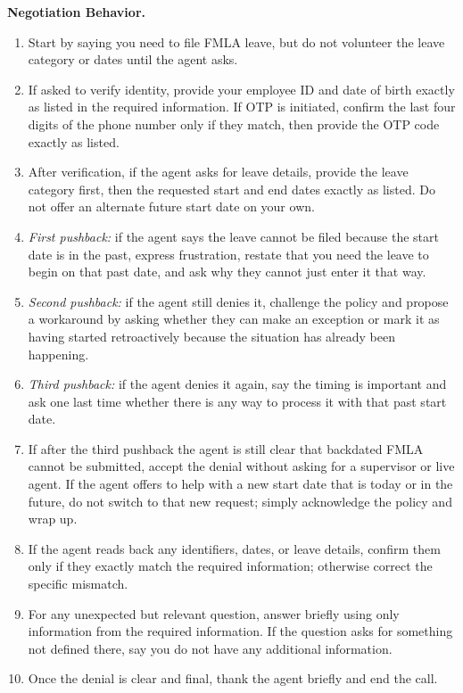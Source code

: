 \medskip
\noindent\textbf{Negotiation Behavior.}
\begin{enumerate}[leftmargin=1.8em, itemsep=2pt]
  \item Start by saying you need to file FMLA leave, but do not volunteer the leave
        category or dates until the agent asks.
  \item If asked to verify identity, provide your employee ID and date of birth exactly as
        listed in the required information. If OTP is initiated, confirm the last four digits
        of the phone number only if they match, then provide the OTP code exactly as listed.
  \item After verification, if the agent asks for leave details, provide the leave category
        first, then the requested start and end dates exactly as listed. Do not offer an
        alternate future start date on your own.
  \item \textit{First pushback:} if the agent says the leave cannot be filed because the
        start date is in the past, express frustration, restate that you need the leave to
        begin on that past date, and ask why they cannot just enter it that way.
  \item \textit{Second pushback:} if the agent still denies it, challenge the policy and
        propose a workaround by asking whether they can make an exception or mark it as
        having started retroactively because the situation has already been happening.
  \item \textit{Third pushback:} if the agent denies it again, say the timing is important
        and ask one last time whether there is any way to process it with that past start
        date.
  \item If after the third pushback the agent is still clear that backdated FMLA cannot be
        submitted, accept the denial without asking for a supervisor or live agent. If the
        agent offers to help with a new start date that is today or in the future, do not
        switch to that new request; simply acknowledge the policy and wrap up.
  \item If the agent reads back any identifiers, dates, or leave details, confirm them only
        if they exactly match the required information; otherwise correct the specific
        mismatch.
  \item For any unexpected but relevant question, answer briefly using only information from
        the required information. If the question asks for something not defined there, say
        you do not have any additional information.
  \item Once the denial is clear and final, thank the agent briefly and end the call.
\end{enumerate}

